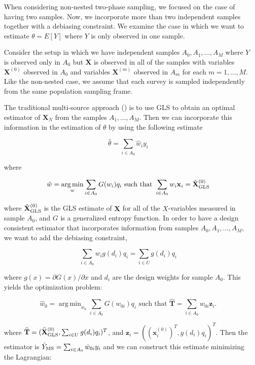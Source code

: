 \documentclass[12pt]{article}
\DeclareMathOperator*{\argmin}{arg\,min}
\renewcommand{\bf}[1]{\mathbf{#1}}
\begin{document}
When considering non-nested two-phase sampling, we focused on the case of having
two samples. Now, we incorporate more than two independent samples
together with a debiasing constraint. We examine the case in which we
want to estimate $\theta = E[Y]$ where $Y$ is only observed in one sample.

Consider the setup in which we have independent samples $A_0, A_1, \dots, A_M$
where $Y$ is observed only in $A_0$ but $\bf X$ is observed in all of the
samples with variables $\bf X^{(0)}$ observed in $A_0$ and variables $\bf X^{(m)}$
observed in $A_m$ for each $m = 1, \dots, M$. Like the non-nested case, we
assume that each survey is sampled independently from the same population
sampling frame.

The traditional multi-source approach (\cite{kim2024statistics}) is to use
GLS to obtain an optimal estimator of $\bf X_N$ from the
samples $A_1, \dots, A_M$. Then we can incorporate this information in the
estimation of $\theta$ by using the following estimate 

$$\hat \theta = \sum_{i \in A_0} \hat w_i y_i$$

where 

\begin{equation}\label{eq:mstps}
\hat w = \argmin_w \sum_{i \in A_0} G(w_i)q_i \text{ such that } 
\sum_{i \in A_0} w_i \bf x_i = \hat{\bf X}_{\rm{GLS}}^{(0)}
\end{equation}

where $\hat{\bf X}_{\rm{GLS}}^{(0)}$ is the GLS estimate of $\bf X$ for all of
the $X$-variables measured in sample $A_0$, and $G$ is a generalized entropy
function. 
In order to have a design consistent estimator that incorporates information from
samples $A_0, A_1, \dots, A_M$, we want to add the debiasing constraint, 

\begin{equation}\label{eq:msdebconstr}
\sum_{i \in A_0} w_{i} g(d_i) q_i = \sum_{i \in U} g(d_i) q_i
\end{equation}

where $g(x) = \partial G(x) / \partial x$ and $d_i$ are the design weights for
sample $A_0$. This yields the optimization problem:

\begin{equation}\label{eq:dc3}
  \hat w_0 = \argmin_{w_0} \sum_{i \in A_0} G(w_{0i}) q_i \text{ such that }
  \widehat{\bf{T}} = \sum_{i \in A_0} w_{0i} \bf z_i.
\end{equation}

where $\widehat{\bf{T}} = (\widehat{\bf X}_{\rm{GLS}}^{(0)},
\sum_{i \in U} g(d_i) q_i)^T$,
and $\bf z_i = ((\bf x_i^{(0)})^T, g(d_i)q_i)^T$. Then
the estimator is $\hat Y_{\rm MS} = \sum_{i \in A_0} \hat w_{0i} y_i$ and we can
construct this estimate minimizing the Lagrangian:
\end{document}
